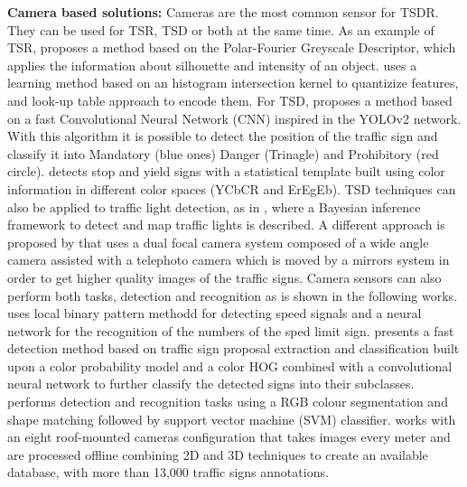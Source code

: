 \begin{flushleft} \textbf{Camera based solutions:}
Cameras are the most common sensor for TSDR. They can be used for TSR, TSD or both at the same time.
As an example of TSR, \cite{frejlichowski2015application} proposes a method based on the Polar-Fourier Greyscale Descriptor, which applies the information about silhouette and intensity of an object. \cite{gao2015learning} uses a learning method based on an histogram intersection kernel to quantizize features, and look-up table approach to encode them.
For TSD, \cite{zhang2017real} proposes a method based on a fast Convolutional Neural Network (CNN) inspired in the YOLOv2 network. With this algorithm it is possible to detect the position of the traffic sign and classify it into Mandatory (blue ones) Danger (Trinagle) and Prohibitory (red circle). \cite{villalon2017traffic} detects stop and yield signs with a statistical template built using color information in different color spaces (YCbCR and ErEgEb). TSD techniques can also be applied to traffic light detection, as in \cite{hosseinyalamdary2017bayesian}, where a Bayesian inference framework to detect and map traffic lights is described. A different approach is proposed by \cite{gu2011traffic} that uses a dual focal camera system composed of a wide angle camera assisted with a telephoto camera which is moved by a mirrors system in order to get higher quality images of the traffic signs.
Camera sensors can also perform both tasks, detection and recognition as is shown in the following works. \cite{miyata2017automatic} uses local binary pattern methodd for detecting speed signals and a neural network for the recognition of the numbers of the sped limit sign. \cite{yang2016towards} presents a fast detection method based on traffic sign proposal extraction and classification built upon a color probability model and a color HOG combined with a convolutional neural network to further classify the detected signs into their subclasses.
\cite{wali2015automatic} performs detection and recognition tasks using a RGB colour segmentation and shape matching followed by support vector machine (SVM) classifier. \cite{timofte2014multi} works with an eight roof-mounted cameras configuration that takes images every meter and are processed offline combining 2D and 3D techniques to create an available database, with more than 13,000 traffic signs annotations.
\end{flushleft}

